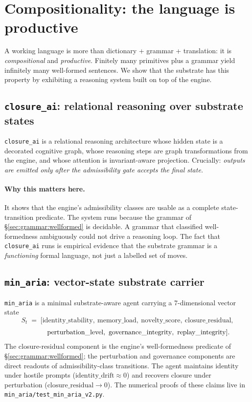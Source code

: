 \documentclass[11pt,a4paper]{article}
\begin{document}
\section{Compositionality: the language is productive}
\label{sec:compositional}

A working language is more than dictionary + grammar + translation:
it is \emph{compositional} and \emph{productive}. Finitely many
primitives plus a grammar yield infinitely many well-formed
sentences. We show that the substrate has this property by
exhibiting a reasoning system built on top of the engine.

\subsection{\texttt{closure\_ai}: relational reasoning over
substrate states}

\texttt{closure\_ai} \cite{closureAI} is a relational reasoning
architecture whose hidden state is a decorated cognitive graph,
whose reasoning steps are graph transformations from the engine,
and whose attention is invariant-aware projection. Crucially:
\emph{outputs are emitted only after the admissibility gate
accepts the final state.}

\paragraph{Why this matters here.} It shows that the engine's
admissibility classes are usable as a complete state-transition
predicate. The system runs because the grammar of
\S\ref{sec:grammar:wellformed} is decidable. A grammar that
classified well-formedness ambiguously could not drive a
reasoning loop. The fact that \texttt{closure\_ai} runs is
empirical evidence that the substrate grammar is a
\emph{functioning} formal language, not just a labelled set of
moves.

\subsection{\texttt{min\_aria}: vector-state substrate carrier}

\texttt{min\_aria} \cite{minAria} is a minimal substrate-aware
agent carrying a 7-dimensional vector state
\[
S_t \;=\; [
  \mathrm{identity\_stability},\
  \mathrm{memory\_load},\
  \mathrm{novelty\_score},\
  \mathrm{closure\_residual},
\]
\[\hphantom{S_t \;=\; [}
  \mathrm{perturbation\_level},\
  \mathrm{governance\_integrity},\
  \mathrm{replay\_integrity}].
\]
The closure-residual component is the engine's well-formedness
predicate of \S\ref{sec:grammar:wellformed}; the perturbation and
governance components are direct readouts of admissibility-class
transitions. The agent maintains identity under hostile prompts
($\mathrm{identity\_drift} \approx 0$) and recovers closure under
perturbation ($\mathrm{closure\_residual} \to 0$). The numerical
proofs of these claims live in
\texttt{min\_aria/test\_min\_aria\_v2.py}.
\end{document}
